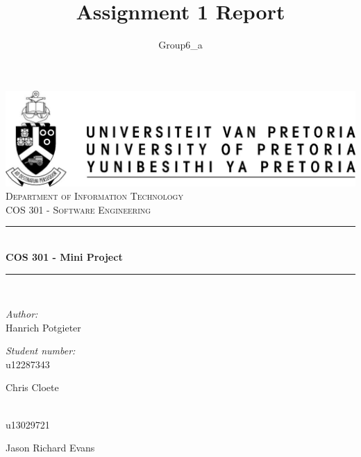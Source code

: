 \documentclass[a4paper,12pt]{report}
\author{Group6_a}
\title{ Assignment 1 Report}
\newcommand{\HRule}{\rule{\linewidth}{0.5mm}}
\begin{document}
\setlength{\parskip}{6pt}

\begin{titlepage}

\begin{center}
\includegraphics[width=1\textwidth]{./up-logo.jpg}\\[0.4cm]    
\textsc{\LARGE Department of Information Technology}\\[1.5cm]
\textsc{\Large COS 301 - Software Engineering}\\[0.5cm]
\HRule \\[0.4cm]
{ \huge \bfseries COS 301 - Mini Project}\\[0.4cm]
\HRule \\[0.4cm]
\begin{minipage}{0.4\textwidth}
\begin{flushleft} \large
\emph{Author:}\\
Hanrich {Potgieter}
\end{flushleft}
\end{minipage}
\begin{minipage}{0.4\textwidth}
\begin{flushright} \large
\emph{Student number:} \\
u12287343
\end{flushright}
\end{minipage}
\begin{minipage}{0.4\textwidth}
\begin{flushleft} \large
Chris {Cloete}
\end{flushleft}
\end{minipage}
\begin{minipage}{0.4\textwidth}
\begin{flushright} \large
\emph{} \\
u13029721
\end{flushright}
\end{minipage}
\begin{minipage}{0.4\textwidth}
\begin{flushleft} \large
Jason Richard {Evans}
\end{flushleft}

\end{minipage}
\end{center}
\end{titlepage}
\end{document}
